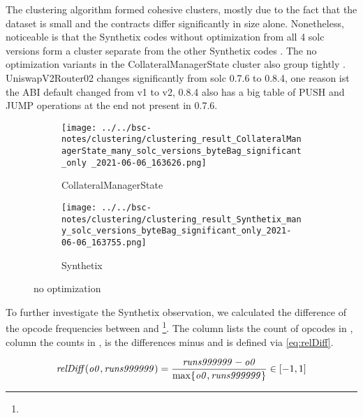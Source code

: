\documentclass[../main.tex]{subfiles}
\begin{document}
The clustering algorithm formed cohesive clusters, mostly due to the fact that the dataset is small and the contracts differ significantly in size alone.
Nonetheless, noticeable is that the Synthetix codes without optimization from all 4 solc versions form a cluster separate from the other Synthetix codes . The no optimization variants in the CollateralManagerState cluster also group tightly .
UniswapV2Router02 changes significantly from solc 0.7.6 to 0.8.4, one reason ist the ABI default changed from v1 to v2, 0.8.4 also has a big table of PUSH and JUMP operations at the end not present in 0.7.6.

\begin{figure}[ht!]
  \begin{subfigure}[b]{0.5 \linewidth}
    \texttt{[image: ../../bsc-notes/clustering/clustering\_result\_CollateralManagerState\_many\_solc\_versions\_byteBag\_significant\_only \_2021-06-06\_163626.png]}%
    \caption{CollateralManagerState}
    \label{fig:CollateralManagerState}
  \end{subfigure}%
  \begin{subfigure}[b]{0.5 \linewidth}
    \texttt{[image: ../../bsc-notes/clustering/clustering\_result\_Synthetix\_many\_solc\_versions\_byteBag\_significant\_only\_2021-06-06\_163755.png]}
    \caption{Synthetix}
    \label{fig:Synthetix}
  \end{subfigure}
  \caption{no optimization}
\end{figure}

To further investigate the Synthetix observation, we calculated the difference of the opcode frequencies between  and  \footnote{}. The column  lists the count of opcodes in , column  the counts in ,  is the differences  minus  and  is defined via \eqref{eq:relDiff}.

\begin{equation}
  \mbox{\textit{relDiff}}(\mbox{\textit{o0}},\mbox{\textit{runs999999}}) = \dfrac{\mbox{\textit{runs999999}} - \mbox{\textit{o0}}}{\max\{\mbox{\textit{o0}}, \mbox{\textit{runs999999}}\}} \in [-1,1]
  \label{eq:relDiff}
\end{equation}
\end{document}
